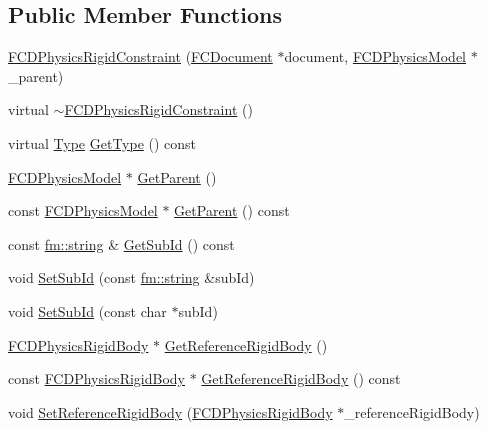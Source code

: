 \subsection*{Public Member Functions}
\begin{DoxyCompactItemize}
\item 
\hyperlink{classFCDPhysicsRigidConstraint_a6625956bba6087887e7003cad5e01ade}{FCDPhysicsRigidConstraint} (\hyperlink{classFCDocument}{FCDocument} $\ast$document, \hyperlink{classFCDPhysicsModel}{FCDPhysicsModel} $\ast$\_\-parent)
\item 
virtual \hyperlink{classFCDPhysicsRigidConstraint_ab109ee91a56b7deaf2659adb1dcdebc6}{$\sim$FCDPhysicsRigidConstraint} ()
\item 
virtual \hyperlink{classFCDEntity_a9301a4bd5f4d4190ec13e40db4effdd7}{Type} \hyperlink{classFCDPhysicsRigidConstraint_a95fd22d9def1fdfedb0000a16a410851}{GetType} () const 
\item 
\hyperlink{classFCDPhysicsModel}{FCDPhysicsModel} $\ast$ \hyperlink{classFCDPhysicsRigidConstraint_aa7aed9e03275e8b757de0044bbd0b395}{GetParent} ()
\item 
const \hyperlink{classFCDPhysicsModel}{FCDPhysicsModel} $\ast$ \hyperlink{classFCDPhysicsRigidConstraint_a376ef778cd819a3bf6d52365cba276ed}{GetParent} () const 
\item 
const \hyperlink{classfm_1_1stringT}{fm::string} \& \hyperlink{classFCDPhysicsRigidConstraint_afb23f9ec2cc4ebcb506c5c3f75fb943d}{GetSubId} () const 
\item 
void \hyperlink{classFCDPhysicsRigidConstraint_a3e2d3a71acb99a4b6d1ca13d01bfa4c6}{SetSubId} (const \hyperlink{classfm_1_1stringT}{fm::string} \&subId)
\item 
void \hyperlink{classFCDPhysicsRigidConstraint_a01b9ad045a6a431783f79964d5c7c979}{SetSubId} (const char $\ast$subId)
\item 
\hyperlink{classFCDPhysicsRigidBody}{FCDPhysicsRigidBody} $\ast$ \hyperlink{classFCDPhysicsRigidConstraint_a201b3ab455119d313914f32edac5a2b1}{GetReferenceRigidBody} ()
\item 
const \hyperlink{classFCDPhysicsRigidBody}{FCDPhysicsRigidBody} $\ast$ \hyperlink{classFCDPhysicsRigidConstraint_aba517b34a3c30353d61a062f4a57cb16}{GetReferenceRigidBody} () const 
\item 
void \hyperlink{classFCDPhysicsRigidConstraint_af2838b8841a6119e36c064aaa1fe8f91}{SetReferenceRigidBody} (\hyperlink{classFCDPhysicsRigidBody}{FCDPhysicsRigidBody} $\ast$\_\-referenceRigidBody)
\item 

\end{DoxyCompactItemize}
